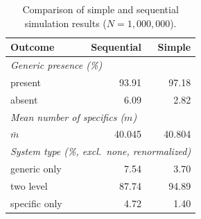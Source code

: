 \begin{table}[ht]
\centering
\caption{Comparison of simple and sequential simulation results ($N = 1{,}000{,}000$).}
\label{tab:sim_comparison}
\begin{tabular}{lrr}
\hline
\textbf{Outcome} & \textbf{Sequential} & \textbf{Simple} \\
\hline
\multicolumn{3}{l}{\textit{Generic presence (\%)}} \\
\quad present & 93.91 & 97.18 \\
\quad absent & 6.09 & 2.82 \\
\hline
\multicolumn{3}{l}{\textit{Mean number of specifics ($m$)}} \\
\quad $\bar{m}$ & 40.045 & 40.804 \\
\hline
\multicolumn{3}{l}{\textit{System type (\%, excl.\ none, renormalized)}} \\
\quad generic only & 7.54 & 3.70 \\
\quad two level & 87.74 & 94.89 \\
\quad specific only & 4.72 & 1.40 \\
\hline
\end{tabular}
\end{table}